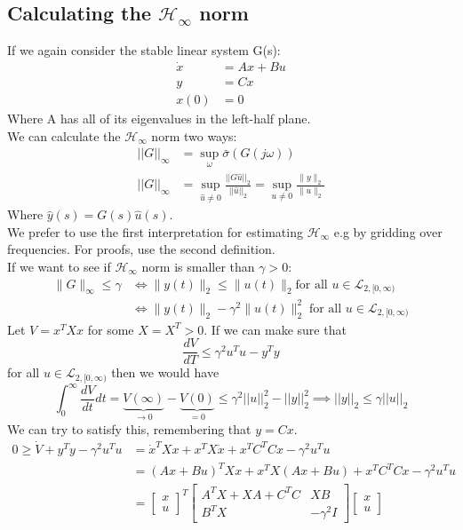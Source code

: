 \documentclass{article}
\begin{document}
\subsection{Calculating the \texorpdfstring{$\mathcal{H}_\infty$}. norm}
If we again consider the stable linear system G(s):
\[
\begin{aligned}
    \dot x &= Ax + Bu \\
    y &= Cx \\
    x(0) &= 0
\end{aligned}
\]
Where A has all of its eigenvalues in the left-half plane. \\
We can calculate the $\mathcal{H}_\infty$ norm two ways:
\[
\begin{aligned}
    ||G||_\infty &= \sup_{\omega} \bar \sigma(G(j\omega)) \\
    ||G||_\infty &= \sup_{\hat u \neq 0} \frac{||G \hat u||_2}{||\hat u||_2} = \sup_{u \neq 0} \frac{\| y \|_2}{\lVert u \rVert_2}
\end{aligned}
\]
Where $\hat y(s) = G(s) \hat u(s)$. \\
We prefer to use the first interpretation for estimating $\mathcal{H}_\infty$ e.g by gridding over frequencies. For proofs, use the second definition.\\
If we want to see if $\mathcal{H}_\infty$ norm is smaller than $\gamma > 0$:
\[
\begin{aligned}
    \| G \|_\infty \leq \gamma &\iff \|y(t)\|_2 \leq \|u(t)\|_2 \text{for all $u \in \mathcal{L}_{2,[0,\infty)}$} \\ 
    &\iff \|y(t)\|_2 - \gamma^2 \|u(t)\|^2_2 \;  \text{for all $u \in \mathcal{L}_{2,[0,\infty)}$}
\end{aligned}
\]
Let $V = x^TXx$ for some $X = X^T > 0$. If we can make sure that
\[
\frac{dV}{dT} \leq \gamma^2 u^Tu -y^Ty
\]
for all $u \in \mathcal{L}_{2,[0,\infty)}$ then we would have
\[
\int_{0}^\infty \frac{dV}{dt}dt = \underbrace{V(\infty)}_{\rightarrow 0} - \underbrace{V(0)}_{= 0} \leq \gamma^2 ||u||^2_2 - ||y||^2_2 \implies ||y||_2 \leq \gamma ||u||_2
\]
We can try to satisfy this, remembering that $y = Cx$.
\[
\begin{aligned}
0 \geq \dot V + y^Ty - \gamma^2 u^Tu &= \dot x^TXx + x^T X \dot x + x^TC^TCx - \gamma^2 u^Tu \\
&= (Ax+Bu)^TXx + x^TX(Ax+Bu) + x^TC^TCx - \gamma^2 u^Tu \\
&= \begin{bmatrix}
    x \\ u
\end{bmatrix}^T
\begin{bmatrix}
    A^TX + XA + C^TC & XB \\
    B^TX & -\gamma^2I
\end{bmatrix}
\begin{bmatrix}
    x \\ u
\end{bmatrix}
\end{aligned}
\]
\end{document}
